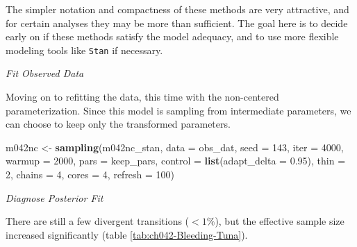 \documentclass[11pt, oneside, openany]{scrbook}
\newenvironment{Shaded}{\begin{snugshade}}{\end{snugshade}}
\newcommand{\CommentTok}[1]{\textcolor[rgb]{0.56,0.35,0.01}{\textit{#1}}}
\newcommand{\DataTypeTok}[1]{\textcolor[rgb]{0.13,0.29,0.53}{#1}}
\newcommand{\DecValTok}[1]{\textcolor[rgb]{0.00,0.00,0.81}{#1}}
\newcommand{\FloatTok}[1]{\textcolor[rgb]{0.00,0.00,0.81}{#1}}
\newcommand{\KeywordTok}[1]{\textcolor[rgb]{0.13,0.29,0.53}{\textbf{#1}}}
\newcommand{\NormalTok}[1]{#1}
\newcommand{\StringTok}[1]{\textcolor[rgb]{0.31,0.60,0.02}{#1}}
\begin{document}
The simpler notation and compactness of these methods are very attractive, and for certain analyses they may be more than sufficient. The goal here is to decide early on if these methods satisfy the model adequacy, and to use more flexible modeling tools like \texttt{Stan} if necessary.

\emph{Fit Observed Data}

Moving on to refitting the data, this time with the non-centered parameterization. Since this model is sampling from intermediate parameters, we can choose to keep only the transformed parameters.

\begin{Shaded}
\begin{Highlighting}[]
\NormalTok{m042nc <-}\StringTok{ }\KeywordTok{sampling}\NormalTok{(m042nc_stan, }\DataTypeTok{data =}\NormalTok{ obs_dat, }\DataTypeTok{seed =} \DecValTok{143}\NormalTok{,}
                   \DataTypeTok{iter =} \DecValTok{4000}\NormalTok{, }\DataTypeTok{warmup =} \DecValTok{2000}\NormalTok{, }\DataTypeTok{pars =}\NormalTok{ keep_pars,}
                   \DataTypeTok{control =} \KeywordTok{list}\NormalTok{(}\DataTypeTok{adapt_delta =} \FloatTok{0.95}\NormalTok{), }\DataTypeTok{thin =} \DecValTok{2}\NormalTok{,}
                   \DataTypeTok{chains =} \DecValTok{4}\NormalTok{, }\DataTypeTok{cores =} \DecValTok{4}\NormalTok{, }\DataTypeTok{refresh =} \DecValTok{100}\NormalTok{)}
\end{Highlighting}
\end{Shaded}

\emph{Diagnose Posterior Fit}

\begin{Shaded}
\end{Shaded}

There are still a few divergent transitions (\(<1\%\)), but the effective sample size increased significantly (table \ref{tab:ch042-Bleeding-Tuna}).
\end{document}
